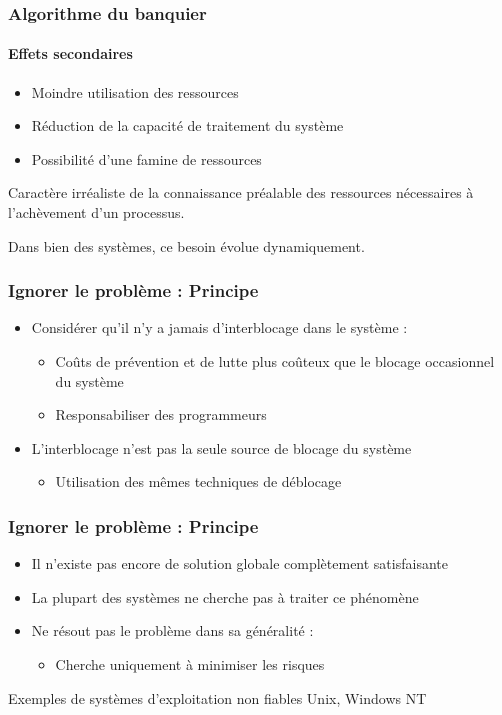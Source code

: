 \begin{frame}
\frametitle{Algorithme du banquier}
\framesubtitle{Effets secondaires}
\begin{itemize}
\item Moindre utilisation des ressources
\item Réduction de la capacité de traitement du système
\item Possibilité d’une famine de ressources
\end{itemize}

Caractère irréaliste de la connaissance préalable des ressources nécessaires à l'achèvement d'un processus.

Dans bien des systèmes, ce besoin évolue dynamiquement.
\end{frame}

\begin{frame}
\frametitle{Ignorer le problème : Principe}
\begin{itemize}
\item Considérer qu’il n’y a jamais d’interblocage dans le système :
\begin{itemize}
\item Coûts de prévention et de lutte plus coûteux que le blocage occasionnel du système
\item Responsabiliser des programmeurs
\end{itemize}
\item L’interblocage n’est pas la seule source de blocage du système
\begin{itemize}
\item Utilisation des mêmes techniques de déblocage
\end{itemize}
\end{itemize}
\end{frame}

\begin{frame}
\frametitle{Ignorer le problème : Principe}
\begin{itemize}
\item Il n’existe pas encore de solution globale complètement satisfaisante
\item La plupart des systèmes ne cherche pas à traiter ce phénomène
\item Ne résout pas le problème dans sa généralité :
\begin{itemize}
\item Cherche uniquement à minimiser les risques
\end{itemize}
\end{itemize}
\begin{exampleblock}{Exemples de systèmes d'exploitation non fiables}
Unix, Windows NT
\end{exampleblock}

\end{frame}

